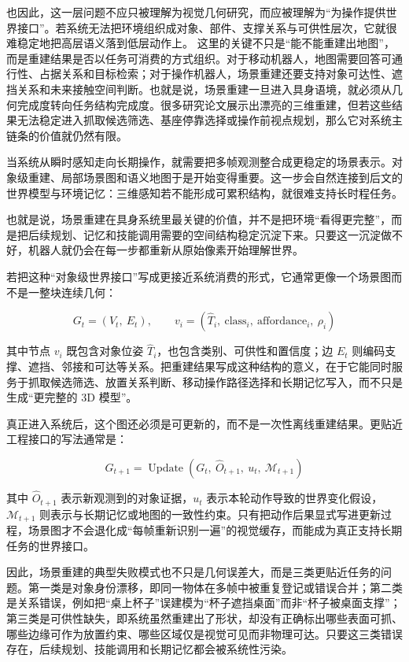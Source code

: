 也因此，这一层问题不应只被理解为视觉几何研究，而应被理解为“为操作提供世界接口”。若系统无法把环境组织成对象、部件、支撑关系与可供性层次，它就很难稳定地把高层语义落到低层动作上。 这里的关键不只是“能不能重建出地图”，而是重建结果是否以任务可消费的方式组织。对于移动机器人，地图需要回答可通行性、占据关系和目标检索；对于操作机器人，场景重建还要支持对象可达性、遮挡关系和未来接触空间判断。也就是说，场景重建一旦进入具身语境，就必须从几何完成度转向任务结构完成度。很多研究论文展示出漂亮的三维重建，但若这些结果无法稳定进入抓取候选筛选、基座停靠选择或操作前视点规划，那么它对系统主链条的价值就仍然有限。

当系统从瞬时感知走向长期操作，就需要把多帧观测整合成更稳定的场景表示。对象级重建、局部场景图和语义地图于是开始变得重要。这一步会自然连接到后文的世界模型与环境记忆：三维感知若不能形成可累积结构，就很难支持长时程任务。

也就是说，场景重建在具身系统里最关键的价值，并不是把环境“看得更完整”，而是把后续规划、记忆和技能调用需要的空间结构稳定沉淀下来。只要这一沉淀做不好，机器人就仍会在每一步都重新从原始像素开始理解世界。

若把这种“对象级世界接口”写成更接近系统消费的形式，它通常更像一个场景图而不是一整块连续几何：

\begingroup
\footnotesize
\begin{equation*}
G_t = (V_t,\ E_t), \qquad
v_i = (\hat T_i,\ \text{class}_i,\ \text{affordance}_i,\ \rho_i)
\end{equation*}
\endgroup

其中节点 \(v_i\) 既包含对象位姿 \(\hat T_i\)，也包含类别、可供性和置信度；边 \(E_t\) 则编码支撑、遮挡、邻接和可达等关系。把重建结果写成这种结构的意义，在于它能同时服务于抓取候选筛选、放置关系判断、移动操作路径选择和长期记忆写入，而不只是生成“更完整的 3D 模型”。

真正进入系统后，这个图还必须是可更新的，而不是一次性离线重建结果。更贴近工程接口的写法通常是：

\begingroup
\footnotesize
\begin{equation*}
G_{t+1}=\operatorname{Update}\!\left(G_t,\ \hat O_{t+1},\ u_t,\ \mathcal{M}_{t+1}\right)
\end{equation*}
\endgroup

其中 \(\hat O_{t+1}\) 表示新观测到的对象证据，\(u_t\) 表示本轮动作导致的世界变化假设，\(\mathcal{M}_{t+1}\) 则表示与长期记忆或地图的一致性约束。只有把动作后果显式写进更新过程，场景图才不会退化成“每帧重新识别一遍”的视觉缓存，而能成为真正支持长期任务的世界接口。

因此，场景重建的典型失败模式也不只是几何误差大，而是三类更贴近任务的问题。第一类是对象身份漂移，即同一物体在多帧中被重复登记或错误合并；第二类是关系错误，例如把“桌上杯子”误建模为“杯子遮挡桌面”而非“杯子被桌面支撑”；第三类是可供性缺失，即系统虽然重建出了形状，却没有正确标出哪些表面可抓、哪些边缘可作为放置约束、哪些区域仅是视觉可见而非物理可达。只要这三类错误存在，后续规划、技能调用和长期记忆都会被系统性污染。

